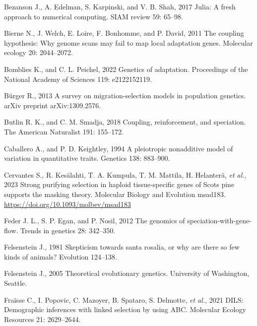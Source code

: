 \documentclass[
  11pt,
]{article}
\newlength{\cslhangindent}
\newlength{\cslentryspacingunit} %
\newenvironment{CSLReferences}[2] %
 {%
  \setlength{\parindent}{0pt}
  \ifodd #1
  \let\oldpar\par
  \def\par{\hangindent=\cslhangindent\oldpar}
  \fi
  \setlength{\parskip}{#2\cslentryspacingunit}
 }%
 {}
\begin{document}
\begin{CSLReferences}{1}{0}
\leavevmode{}%
Bezanson J., A. Edelman, S. Karpinski, and V. B. Shah, 2017 Julia: A
fresh approach to numerical computing. SIAM review 59: 65--98.

\leavevmode{}%
Bierne N., J. Welch, E. Loire, F. Bonhomme, and P. David, 2011 The
coupling hypothesis: Why genome scans may fail to map local adaptation
genes. Molecular ecology 20: 2044--2072.

\leavevmode{}%
Bomblies K., and C. L. Peichel, 2022 Genetics of adaptation. Proceedings
of the National Academy of Sciences 119: e2122152119.

\leavevmode{}%
Bürger R., 2013 A survey on migration-selection models in population
genetics. arXiv preprint arXiv:1309.2576.

\leavevmode{}%
Butlin R. K., and C. M. Smadja, 2018 Coupling, reinforcement, and
speciation. The American Naturalist 191: 155--172.

\leavevmode{}%
Caballero A., and P. D. Keightley, 1994 A pleiotropic nonadditive model
of variation in quantitative traits. Genetics 138: 883--900.

\leavevmode{}%
Cervantes S., R. Kesälahti, T. A. Kumpula, T. M. Mattila, H. Helanterä,
\emph{et al.}, 2023 {Strong purifying selection in haploid
tissue-specific genes of Scots pine supports the masking theory}.
Molecular Biology and Evolution msad183.
\url{https://doi.org/10.1093/molbev/msad183}

\leavevmode{}%
Feder J. L., S. P. Egan, and P. Nosil, 2012 The genomics of
speciation-with-gene-flow. Trends in genetics 28: 342--350.

\leavevmode{}%
Felsenstein J., 1981 Skepticism towards santa rosalia, or why are there
so few kinds of animals? Evolution 124--138.

\leavevmode{}%
Felsenstein J., 2005 Theoretical evolutionary genetics. University of
Washington, Seattle.

\leavevmode{}%
Fraïsse C., I. Popovic, C. Mazoyer, B. Spataro, S. Delmotte, \emph{et
al.}, 2021 DILS: Demographic inferences with linked selection by using
ABC. Molecular Ecology Resources 21: 2629--2644.


\end{CSLReferences}
\end{document}
